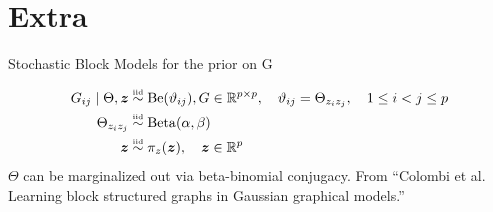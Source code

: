 \section*{Extra}
\begin{frame}{Stochastic Block Models for the prior on G}

\begin{align*}
    G_{ij} \mid \Theta,\bm{z} &\overset{\text{\tiny{iid}}}{\sim} \operatorname{Be}(\vartheta_{ij}),  G \in \mathbb{R}^{p \times p}, \quad \vartheta_{ij} = \Theta_{z_{i}z_{j}}, \quad 1 \le i < j \le p \\ 
    \Theta_{z_{i}z_{j}} &\overset{\text{\tiny{iid}}}{\sim} \operatorname{Beta}(\alpha, \beta)\\
    \bm{z} &\overset{\text{\tiny{iid}}}{\sim} \pi_{z}(\bm{z}), \quad \bm{z} \in \mathbb{R}^p
\end{align*}
$\Theta$ can be marginalized out via beta-binomial conjugacy.
{\scriptsize From ``Colombi et al. Learning block structured graphs in Gaussian graphical models.''}
\end{frame}


